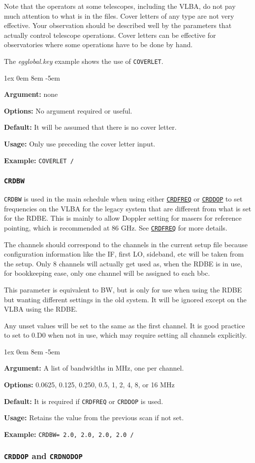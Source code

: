 \documentclass{report}
\newcommand{\rcwbox}[5]{
  \begin{list}{}{\parsep 1ex  \itemsep 0em
                 \leftmargin 8em  \itemindent -5em }
    \item {\bf Argument:} #1
    \item {\bf Options:}  #2
    \item {\bf Default:}  #3
    \item {\bf Usage:}    #4
    \item {\bf Example:}  #5
  \end{list}
}
\begin{document}
Note that the operators at some telescopes, including the VLBA, do
not pay much attention to what is in the files.  Cover letters
of any type are not very effective.  Your observation should be
described well by the parameters that actually control telescope
operations.  Cover letters can be effective for observatories where
some operations have to be done by hand.

The {\sl egglobal.key} example shows the use of {\tt COVERLET}.

\rcwbox
{none}
{No argument required or useful.}
{It will be assumed that there is no cover letter.}
{Only use preceding the cover letter input.}
{{\tt COVERLET /}}


\subsubsection{\label{MP:CRDBW}{\tt CRDBW}}

{\tt CRDBW} is used in the main schedule when using either 
{\hyperref[MP:CRDFREQ]{{\tt CRDFREQ}}} or 
{\hyperref[MP:CRDDOP]{{\tt CRDDOP}}}
to set frequencies on the VLBA for the legacy system that are 
different from what is set for the RDBE.  This is mainly to allow
Doppler setting for masers for reference pointing, which is recommended
at 86 GHz.  See 
{\hyperref[MP:CRDFREQ]{{\tt CRDFREQ}}} for more
details.

The channels should correspond to the channels in the current setup
file because configuration information like the IF, first LO, sideband,
etc will be taken from the setup.  Only 8 channels will actually get
used as, when the RDBE is in use, for bookkeeping ease, only one channel
will be assigned to each bbc.

This parameter is equivalent to BW, but is only for use when using the
RDBE but wanting different settings in the old system.  It will be
ignored except on the VLBA using the RDBE.

Any unset values will be set to the same as the first channel.  It is
good practice to set to 0.D0 when not in use, which may require setting
all channels explicitly.

\rcwbox
{A list of bandwidths in MHz, one per channel.}
{0.0625, 0.125, 0.250, 0.5, 1, 2, 4, 8, or 16 MHz}
{It is required if {\tt CRDFREQ} or {\tt CRDDOP} is used.}
{Retains the value from the previous scan if not set.}
{{\tt CRDBW= 2.0, 2.0, 2.0, 2.0 /}}

\subsubsection{\label{MP:CRDDOP}{{\tt CRDDOP} and {\tt CRDNODOP}}}
\end{document}
